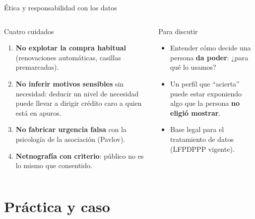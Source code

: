 \documentclass[aspectratio=169,xcolor=dvipsnames]{beamer}
\begin{document}
\begin{frame}{Ética y responsabilidad con los datos}
\begin{columns}[T]
  \begin{alertblock}{Cuatro cuidados}
    \footnotesize
    \begin{enumerate}
      \item \textbf{No explotar la compra habitual} (renovaciones automáticas, casillas premarcadas).
      \item \textbf{No inferir motivos sensibles} sin necesidad: deducir un nivel de necesidad puede llevar a dirigir crédito caro a quien está en apuros.
      \item \textbf{No fabricar urgencia falsa} con la psicología de la asociación (Pavlov).
      \item \textbf{Netnografía con criterio}: público no es lo mismo que consentido.
    \end{enumerate}
  \end{alertblock}
  \begin{block}{Para discutir}
    \footnotesize
    \begin{itemize}
      \item Entender cómo decide una persona \textbf{da poder}: ¿para qué lo usamos?
      \item Un perfil que \enquote{acierta} puede estar exponiendo algo que la persona \textbf{no eligió mostrar}.
      \item Base legal para el tratamiento de datos (LFPDPPP vigente).
    \end{itemize}
  \end{block}
\end{columns}
\end{frame}

\section[Práctica y caso]{Práctica y caso}
\end{document}
